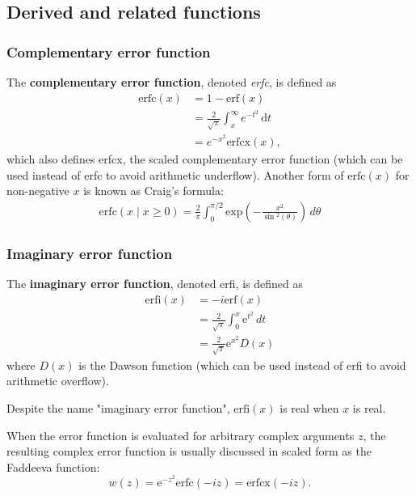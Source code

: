 \documentclass{article}
\begin{document}
	\subsection{Derived and related functions}
	\subsubsection{Complementary error function}
	The \textbf{complementary error function}, denoted \emph{erfc}, is defined as
	\begin{align}
		\mathrm{erfc}(x) & = 1-\mathrm{erf}(x) \\
		& = \frac{2}{\sqrt\pi} \int_x^\infty e^{-t^2}\,\mathrm dt \\
		& = e^{-x^2} \mathrm{erfcx}(x),
	\end{align}
	which also defines erfcx, the scaled complementary error function (which can be used instead of erfc to avoid arithmetic underflow). Another form of $\mathrm{erfc} (x)$ for non-negative $x$ is known as Craig's formula:
	\begin{align}
		\mathrm{erfc}(x \mid x\geq 0) = \frac{2}{\pi} \int_{0}^{\pi/2} \mathrm{exp}\left( - \frac{x^2}{\sin\!^2\left(\theta\right) }  \right)   \,d\theta 
	\end{align}
	
	\subsubsection{Imaginary error function}
	The \textbf{imaginary error function}, denoted erfi, is defined as
	\begin{align}
		\mathrm{erfi}(x) &= -i \mathrm{erf}(x) \\
		&= \frac{2}{\sqrt{\pi}} \int_{0}^{x} \mathrm e^{t^2} \,dt \\ 
		&= \frac{2}{\sqrt{\pi}} \mathrm e^{x^2} D(x) 
	\end{align}
	where $D(x)$ is the Dawson function (which can be used instead of erfi to avoid arithmetic overflow).

	Despite the name "imaginary error function", $\mathrm{erfi} (x)$ is real when $x$ is real.

	When the error function is evaluated for arbitrary complex arguments $z$, the resulting complex error function is usually discussed in scaled form as the Faddeeva function:
	\[
		w(z) = \mathrm e^{-z^2} \mathrm{erfc}(-i z) = \mathrm{erfcx}(-i z).
	\]
\end{document}
